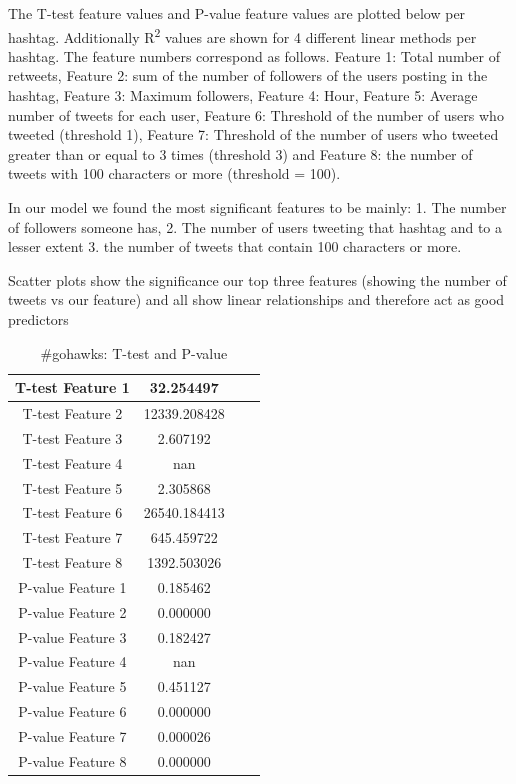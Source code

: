 \documentclass[12pt]{article}
\begin{document}
The T-test feature values and P-value feature values are plotted below per hashtag. Additionally R\textsuperscript2 values are shown for 4 different linear methods per hashtag. The feature numbers correspond as follows. Feature 1: Total number of retweets, Feature 2:  sum of the number of followers of the users posting in the hashtag, Feature 3:  Maximum followers, Feature 4: Hour, Feature 5: Average number of tweets for each user, Feature 6: Threshold of the number of users who tweeted (threshold 1), Feature 7: Threshold of the number of users who tweeted greater than or equal to 3 times (threshold 3) and Feature 8: the number of tweets with 100 characters or more (threshold = 100).

In our model we found the most significant features to be mainly: 1. The number of followers someone has, 2. The number of users tweeting that hashtag and to a lesser extent 3. the number of tweets that contain 100 characters or more. 

Scatter plots show the significance our top three features (showing the number of tweets vs  our feature) and all show linear relationships and therefore act as good predictors




\begin{table}[H]
	\centering
	\begin{tabular}{| c | c | c | c |}
		\hline 
		T-test Feature 1 & 32.254497 \\\hline
		T-test Feature 2 & 12339.208428 \\\hline
		T-test Feature 3 & 2.607192 \\\hline 
		T-test Feature 4 & nan \\\hline
		T-test Feature 5 & 2.305868 \\\hline
		T-test Feature 6 & 26540.184413 \\\hline
		T-test Feature 7 & 645.459722 \\\hline
		T-test Feature 8 & 1392.503026 \\\hline
		P-value Feature 1 & 0.185462 \\\hline
		P-value Feature 2 & 0.000000 \\\hline
		P-value Feature 3 & 0.182427 \\\hline
		P-value Feature 4 & nan \\\hline
		P-value Feature 5 & 0.451127 \\\hline
		P-value Feature 6 & 0.000000 \\\hline
		P-value Feature 7 & 0.000026 \\\hline
		P-value Feature 8 & 0.000000 \\\hline
	\end{tabular} 
	\caption{\#gohawks: T-test and P-value}
	\label{part1:tab1}
\end{table} 
\end{document}
